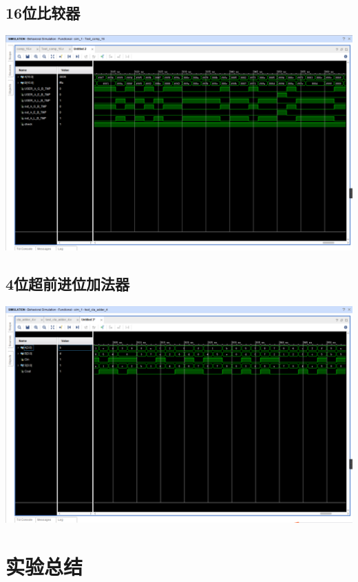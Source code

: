 \documentclass{article}
\begin{document}
\subsection{16位比较器}

\begin{center}
    \includegraphics[width=500pt]{assets/image_comp_16.png}
\end{center}

\subsection{4位超前进位加法器}

\begin{center}
    \includegraphics[width=500pt]{assets/image_cla_adder_4.png}
\end{center}

\section{实验总结}
\end{document}

